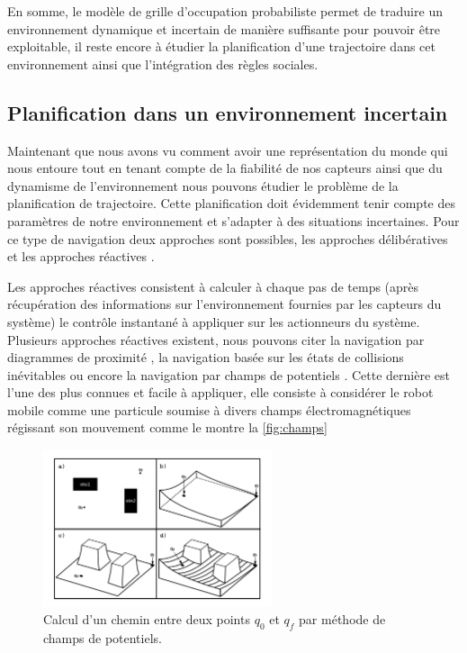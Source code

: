 En somme, le modèle de grille d'occupation probabiliste permet de traduire un environnement dynamique et incertain de manière suffisante pour pouvoir être exploitable, il reste encore à étudier la planification d'une trajectoire dans cet environnement ainsi que l'intégration des règles sociales.

\subsection{Planification dans un environnement incertain} 

Maintenant que nous avons vu comment avoir une représentation du monde qui nous entoure tout en tenant compte de la fiabilité de nos capteurs ainsi que du dynamisme de l'environnement nous pouvons étudier le problème de la planification de trajectoire. Cette planification doit évidemment tenir compte des paramètres de notre environnement et s'adapter à des situations incertaines. Pour ce type de navigation deux approches sont possibles, les approches délibératives et les approches réactives \cite{delsart_navigation_2011}. 

Les approches réactives consistent à calculer à chaque pas de temps (après récupération des informations sur l'environnement fournies par les capteurs du système) le contrôle instantané à appliquer sur les actionneurs du système. Plusieurs approches réactives existent, nous pouvons citer la navigation par diagrammes de proximité \cite{minguez_nearness_2000}, la navigation basée sur les états de collisions inévitables \cite{martinez-gomez_collision_2009} ou encore la navigation par champs de potentiels \cite{khatib_real-time_1985}. Cette dernière est l'une des plus connues et facile à appliquer, elle consiste à considérer le robot mobile comme une particule soumise à divers champs électromagnétiques régissant son mouvement comme le montre la \autoref{fig:champs}

\begin{figure}[H]
    \centering
    \includegraphics[width=0.6\textwidth]{Rapport/images/champs.png}
    \caption{Calcul d'un chemin entre deux points $q_0$ et $q_f$ par méthode de champs de potentiels.}
    \label{fig:champs}
\end{figure}

